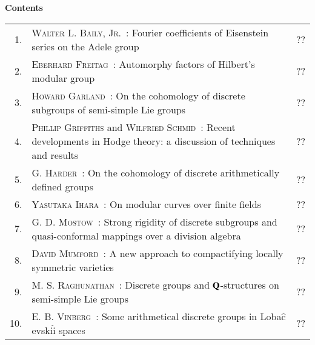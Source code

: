 
\thispagestyle{empty}

\noindent
{\bf\huge Contents}

\vskip 1cm


\noindent
\renewcommand{\arraystretch}{1.7}
\begin{longtable}[l]{r>{\raggedright}p{9cm}r}
1. & \textsc{Walter L. Baily, Jr.~:} Fourier coefficients of Eisenstein series on the Adele group & ?? \\
2. & \textsc{Eberhard Freitag~:} Automorphy factors of Hilbert's modular group & ?? \\
3. & \textsc{Howard Garland~:} On the cohomology of discrete subgroups of semi-simple Lie groups & ?? \\
4. & \textsc{Phillip Griffiths} and \textsc{Wilfried Schmid~:} Recent developments in Hodge theory: a discussion of techniques and results & ?? \\
5. & \textsc{G. Harder~:} On the cohomology of discrete arithmetically defined groups & ?? \\
6. & \textsc{Yasutaka Ihara~:} On modular curves over finite fields & ?? \\
7. & \textsc{G. D. Mostow~:} Strong rigidity of discrete subgroups and quasi-conformal mappings over a division algebra & ?? \\
8. & \textsc{David Mumford~:} A new approach to compactifying locally symmetric varieties & ?? \\
9. &  \textsc{M. S. Raghunathan~:} Discrete groups and $\mathbf{Q}$-structures on semi-simple Lie groups & ?? \\
10. &  \textsc{E. B. Vinberg~:} Some arithmetical discrete groups in Loba$\hat{\text{c}}$evski$\hat{\text{i}}$ spaces & ?? 
\end{longtable}

\thispagestyle{empty}
